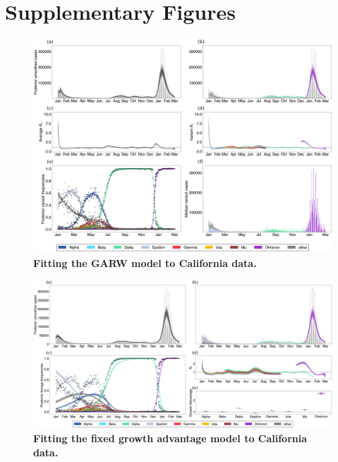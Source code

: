 \section{Supplementary Figures}

\begin{figure}
  \centering
  \includegraphics[width=\linewidth]{figs/GARW_rt_California.png}
  \caption{\textbf{Fitting the GARW model to California data.}}%
  \label{fig:GARW_rt_California}
\end{figure}

\begin{figure}
  \centering
  \includegraphics[width=\linewidth]{figs/fixed_growth_California.png}
  \caption{\textbf{Fitting the fixed growth advantage model to California data.}}%
  \label{fig:fixed_growth_California}
\end{figure}


